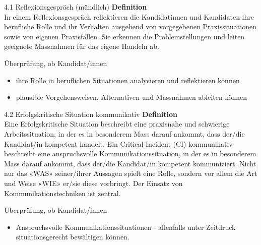 \begin{frame}{4.1 Reflexionsgespräch (mündlich)}
    \textbf{Definition} \\
    In einem Reflexionsgespräch reflektieren die Kandidatinnen und Kandidaten ihre berufliche Rolle und ihr Verhalten ausgehend von vorgegebenen Praxissituationen sowie von eigenen Praxisfällen. Sie erkennen die Problemstellungen und leiten geeignete Massnahmen für das eigene Handeln ab.
\vspace{1em}



    \begin{myLernziele}
        Überprüfung, ob Kandidat/innen
\begin{itemize}
    \item[\textbullet]  ihre Rolle in beruflichen Situationen analysieren und reflektieren können
    \item[\textbullet]  plausible Vorgehensweisen, Alternativen und Massnahmen ableiten können
\end{itemize}
\end{myLernziele}

\end{frame}


\begin{frame}{4.2 Erfolgskritische Situation kommunikativ }
    \textbf{Definition} \\
Eine Erfolgskritische Situation beschreibt eine praxisnahe und schwierige Arbeitssituation, in der es in besonderem Mass darauf ankommt, dass der/die Kandidat/in kompetent handelt. Ein Critical Incident (CI) kommunikativ beschreibt eine anspruchsvolle Kommunikationssituation, in der es in besonderem Mass darauf ankommt, dass der/die Kandidat/in kompetent kommuniziert. Nicht nur das «WAS» seiner/ihrer Aussagen spielt eine Rolle, sondern vor allem die Art und Weise «WIE» er/sie diese vorbringt. Der Einsatz von Kommunikationstechniken ist zentral.

    \begin{myLernziele}
        Überprüfung, ob Kandidat/innen
\begin{itemize}
    \item[\textbullet]  Anspruchsvolle Kommunikationssituationen - allenfalls unter Zeitdruck situationsgerecht bewältigen können.
\end{itemize}   
\end{myLernziele}

\end{frame}


